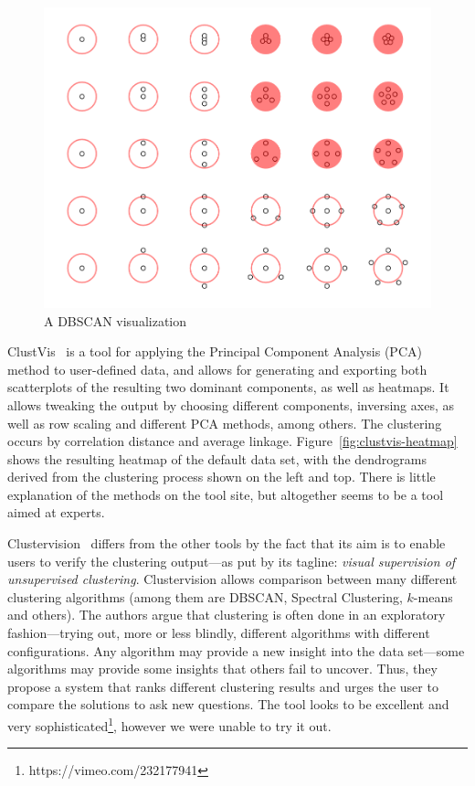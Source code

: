 \documentclass{vgtc} %
\begin{document}
\begin{figure}[tb]
    \centering
    \includegraphics[width=0.7\columnwidth]{dbscan}
    \caption{A DBSCAN visualization}
    \label{fig:dbscan}
\end{figure}

ClustVis~\cite{clustvis} is a tool for applying the Principal Component Analysis (PCA) method
to user-defined data, and allows for generating and exporting both scatterplots
of the resulting two dominant components, as well as heatmaps. It allows tweaking
the output by choosing different components, inversing axes, as well as row scaling
and different PCA methods, among others. The clustering occurs by correlation distance
and average linkage. Figure~\ref{fig:clustvis-heatmap} shows the resulting heatmap of
the default data set, with the dendrograms derived from the clustering process shown
on the left and top. There is little explanation of the methods on the tool site, but
altogether seems to be a tool aimed at experts.

Clustervision~\cite{clustervision} differs from the other tools by the fact
that its aim is to enable users to verify the clustering output---as put by its
tagline: \emph{visual supervision of unsupervised clustering}. Clustervision
allows comparison between many different clustering algorithms (among them are
DBSCAN, Spectral Clustering, $k$-means and others). The authors argue that
clustering is often done in an exploratory fashion---trying out, more or less
blindly, different algorithms with different configurations. Any algorithm may
provide a new insight into the data set---some algorithms may provide some
insights that others fail to uncover. Thus, they propose a system that ranks
different clustering results and urges the user to compare the solutions to ask
new questions. The tool looks to be excellent and very sophisticated\footnote{https://vimeo.com/232177941},
however we were unable to try it out.
\end{document}

